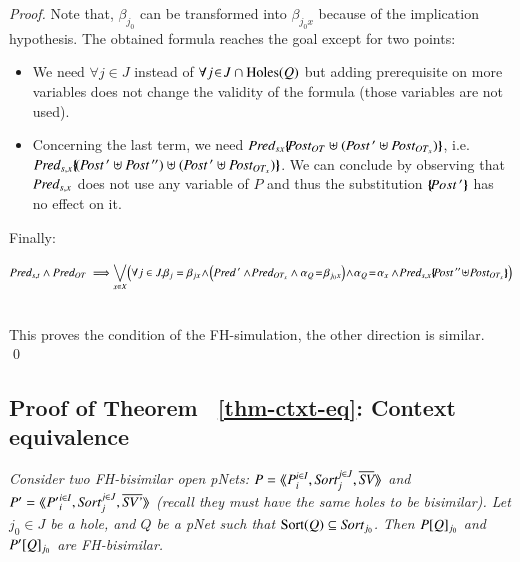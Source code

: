 \documentclass{elsarticle}
\newcommand{\TODO}[1]{\textcolor{red}{\textbf{[TODO:#1]}}}
\begin{document}
\begin{proof}
 Note that, $\beta_{j_0}$ can be transformed into  $\beta_{j_0 x}$ because of the 
 implication hypothesis.
% 
 The obtained formula reaches the goal except for 
 two points:
 \begin{itemize}
 	\item We need $\forall j\!\in\! J$ instead of $\forall j\!\in\! J\cap\operatorname{Holes}(Q)$  but  
 	adding prerequisite on more variables 
 	does not   	change the validity of the formula (those variables are not used).
\fussy
 	\item Concerning the last term, we need 
 	$\Pred_{s x}\subst{\Post_{OT}\uplus(\Post\,'\uplus \Post_{OT_x})}$, i.e.
 	$\Pred_{s, x}\subst{(\Post\,'\uplus 	\Post\,'')\uplus(\Post\,'\uplus \Post_{OT_x})}$. We 
 	can conclude by observing that	$\Pred_{s,x}$ does not use any variable of $P$ 
 	and thus the substitution $\{\hspace{-0.68ex}\{\!Post\,'\}\hspace{-0.67ex}\}$ has no effect on it.
\sloppy
 \end{itemize}	
Finally: \\
\begin{small} $\Pred_{s,t} \land \Pred_{OT} \implies\\
{\displaystyle\bigvee_{x\in X}
 		\!\Big( \forall j\in J. \beta_j=\beta_{jx} \! \land\! 
 		\left(\Pred\,'\land\! \Pred_{OT_x}
 		 \land \alpha_Q\!=\!\beta_{j_0 x}\right)\! \land\! \alpha_Q\!=\!\alpha_x\land\!  \Pred_{s, x}\subst{\Post\,''\!\uplus\!\Post_{OT_x}}\Big)
 		}$
 		\end{small}\\
This proves the  condition of the FH-simulation, the other direction is 
 similar. \qed

\end{proof}
        \subsection{Proof of Theorem ~\ref{thm-ctxt-eq}: Context equivalence}
\textit{	Consider two FH-bisimilar open pNets:
	$\pNet = \mylangle \pNet_i^{i\in I}, \Sort_j^{j\in J}, 
	\set{\symb{SV}}\myrangle$ and 	$\pNet' = \mylangle {\pNet'}_i^{i\in I}, 
	\Sort_j^{j\in 
	J}, 	\set{\symb{SV'}}\myrangle$ 
	(recall they must have the same holes to be bisimilar).
	Let $j_0\in J$ be a hole, and $Q$ be a pNet such that $\Sortop(Q)\subseteq\Sort_{j_0}$. Then 
	$P[Q]_{j_0}$ and 
	$P'[Q]_{j_0}$ are FH-bisimilar.
}
\end{document}
